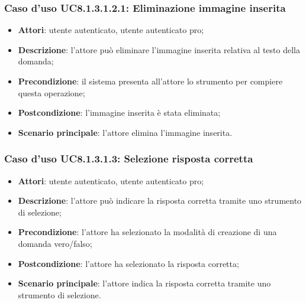 	\subsubsection{Caso d'uso UC8.1.3.1.2.1: Eliminazione immagine inserita}
		\begin{itemize}
		\item
			\textbf{Attori}: utente autenticato, utente autenticato pro;
		\item		
			\textbf{Descrizione}: l'attore può eliminare l'immagine inserita relativa al testo della domanda;
		\item
			\textbf{Precondizione}: il sistema presenta all'attore lo strumento per compiere questa operazione;
		\item
			\textbf{Postcondizione}: l'immagine inserita è stata eliminata;
		\item
			\textbf{Scenario principale}: l'attore elimina l'immagine inserita.				
		\end{itemize}

\subsubsection{Caso d'uso UC8.1.3.1.3: Selezione risposta corretta}
	\begin{itemize}
		\item
			\textbf{Attori}: utente autenticato, utente autenticato pro;
		\item		
			\textbf{Descrizione}: l'attore può indicare la risposta corretta tramite uno strumento di selezione;
		\item
			\textbf{Precondizione}: l'attore ha selezionato la modalità di creazione di una domanda vero/falso; 
		\item
			\textbf{Postcondizione}: l'attore ha selezionato la risposta corretta;
		\item
			\textbf{Scenario principale}: l'attore indica la risposta corretta tramite uno strumento di selezione. 
	 			
	\end{itemize}
	

	
